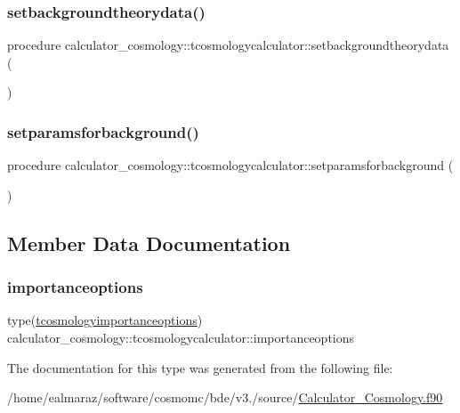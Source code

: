 \subsubsection{\texorpdfstring{setbackgroundtheorydata()}{setbackgroundtheorydata()}}
{\footnotesize\ttfamily procedure calculator\+\_\+cosmology\+::tcosmologycalculator\+::setbackgroundtheorydata (\begin{DoxyParamCaption}{ }\end{DoxyParamCaption})\hspace{0.3cm}{\ttfamily [private]}}

\mbox{\label{structcalculator__cosmology_1_1tcosmologycalculator_adbee1a9cd85334564f4b07a38b85d61e}} 
\subsubsection{\texorpdfstring{setparamsforbackground()}{setparamsforbackground()}}
{\footnotesize\ttfamily procedure calculator\+\_\+cosmology\+::tcosmologycalculator\+::setparamsforbackground (\begin{DoxyParamCaption}{ }\end{DoxyParamCaption})\hspace{0.3cm}{\ttfamily [private]}}



\subsection{Member Data Documentation}
\mbox{\label{structcalculator__cosmology_1_1tcosmologycalculator_a7e34162850a01e3e3dbfd5043e689553}} 
\subsubsection{\texorpdfstring{importanceoptions}{importanceoptions}}
{\footnotesize\ttfamily type(\mbox{\hyperlink{structcalculator__cosmology_1_1tcosmologyimportanceoptions}{tcosmologyimportanceoptions}}) calculator\+\_\+cosmology\+::tcosmologycalculator\+::importanceoptions\hspace{0.3cm}{\ttfamily [private]}}



The documentation for this type was generated from the following file\+:\begin{DoxyCompactItemize}
\item 
/home/ealmaraz/software/cosmomc/bde/v3./source/\mbox{\hyperlink{Calculator__Cosmology_8f90}{Calculator\+\_\+\+Cosmology.\+f90}}\end{DoxyCompactItemize}
